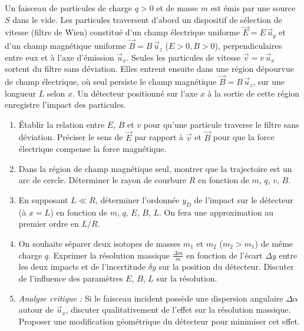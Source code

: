 \documentclass[11pt]{article}
\begin{document}
\begin{exercice}
Un faisceau de particules de charge $q>0$ et de masse $m$ est émis par une source $S$ dans le vide. Les particules traversent d'abord un dispositif de sélection de vitesse (filtre de Wien) constitué d'un champ électrique uniforme $\vec{E}=E\,\vec{u}_y$ et d'un champ magnétique uniforme $\vec{B}=B\,\vec{u}_z$ ($E>0, B>0$), perpendiculaires entre eux et à l'axe d'émission $\vec{u}_x$. Seules les particules de vitesse $\vec{v}=v\,\vec{u}_x$ sortent du filtre sans déviation. Elles entrent ensuite dans une région dépourvue de champ électrique, où seul persiste le champ magnétique $\vec{B}=B\,\vec{u}_z$, sur une longueur $L$ selon $x$. Un détecteur positionné sur l'axe $x$ à la sortie de cette région enregistre l'impact des particules.
\begin{enumerate}
    \item Établir la relation entre $E$, $B$ et $v$ pour qu'une particule traverse le filtre sans déviation. Préciser le sens de $\vec{E}$ par rapport à $\vec{v}$ et $\vec{B}$ pour que la force électrique compense la force magnétique.
    \item Dans la région de champ magnétique seul, montrer que la trajectoire est un arc de cercle. Déterminer le rayon de courbure $R$ en fonction de $m$, $q$, $v$, $B$.
    \item En supposant $L \ll R$, déterminer l'ordonnée $y_D$ de l'impact sur le détecteur (à $x=L$) en fonction de $m$, $q$, $E$, $B$, $L$. On fera une approximation au premier ordre en $L/R$.
    \item On souhaite séparer deux isotopes de masses $m_1$ et $m_2$ ($m_2 > m_1$) de même charge $q$. Exprimer la résolution massique $\frac{\Delta m}{m}$ en fonction de l'écart $\Delta y$ entre les deux impacts et de l'incertitude $\delta y$ sur la position du détecteur. Discuter de l'influence des paramètres $E$, $B$, $L$ sur la résolution.
    \item \textit{Analyse critique :} Si le faisceau incident possède une dispersion angulaire $\Delta \alpha$ autour de $\vec{u}_x$, discuter qualitativement de l'effet sur la résolution massique. Proposer une modification géométrique du détecteur pour minimiser cet effet.
\end{enumerate}
\end{exercice}
\end{document}
